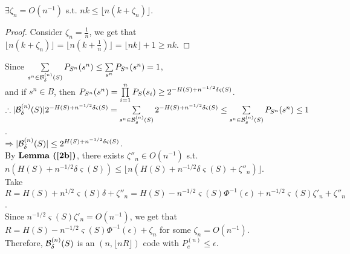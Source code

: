 \begin{pr}
\begin{enumerate}[(a)]

\begin{lm}\label{2b}
$\exists\zeta_n=O(n^{-1})$ s.t. $nk\leq\lfloor n(k+\zeta_n)\rfloor$.
\begin{proof}
Consider $\zeta_n=\frac1n$, we get that $\lfloor n(k+\zeta_n)\rfloor=\lfloor n(k+\frac1n)\rfloor=\lfloor nk\rfloor+1\geq nk$.
\end{proof}
\end{lm}
Since $\sum\limits_{s^n\in{\mathcal{B}_\delta^{(n)}(S)}}P_{S^n}(s^n)\leq\sum\limits_{s^n}P_{S^n}(s^n)=1$,\\
and if $s^n\in B$, then $P_{S^n}(s^n)=\prodl_{i=1}^nP_S(s_i)\geq2^{-\cst}$.\\
$\so|\B|2^{-\cst}=\suml_{s^n\in\B}2^{-\cst}\leq\suml_{s^n\in\B}P_{S^n}(s^n)\leq1$.\\
$\then|\B|\leq2^\cst$.\\
\renewcommand{\cst}{{H(S)+n^{-1/2}\delta\varsigma(S)}}
By $\rflm{2b}$, there exists $\zeta''_n\in O(n^{-1})$ s.t. $n(\cst)\leq\lfloor n(\cst+\zeta''_n)\rfloor$.\\
Take $R=H(S)+n^{1/2}\varsigma(S)\delta+\zeta''_n=H(S)-n^{-1/2}\varsigma(S)\Phi^{-1}(\epsilon)+n^{-1/2}\varsigma(S)\zeta'_n+\zeta''_n$.\\
Since $n^{-1/2}\varsigma(S)\zeta'_n=O(n^{-1})$, we get that $R=H(S)-n^{-1/2}\varsigma(S)\Phi^{-1}(\epsilon)+\zeta_n$ for some $\zeta_n=O(n^{-1})$.\\
Therefore, ${\mathcal{B}_\delta^{(n)}(S)}$ is an $(n, \lfloor nR\rfloor)$ code with $P_e^{(n)}\leq\epsilon$.

\end{enumerate}
\end{pr}
